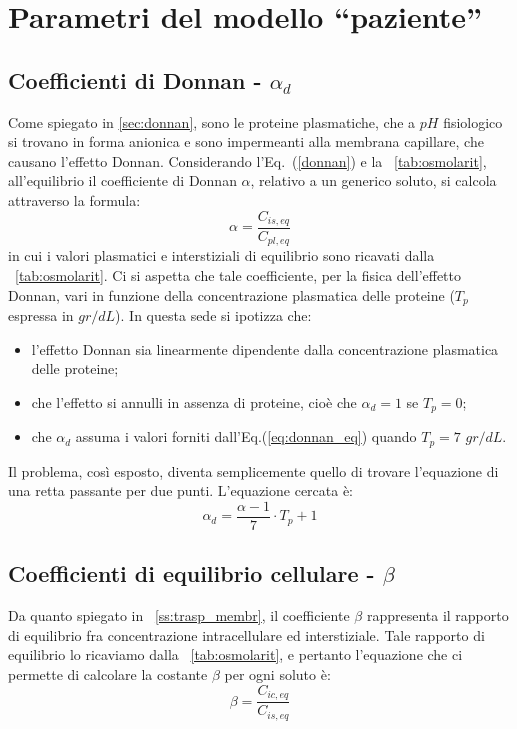 \chapter{Parametri del modello ``paziente''}\label{app:A}
\section{Coefficienti di Donnan - $\alpha_d$}
Come spiegato in \textsection\ref{sec:donnan}, sono le proteine plasmatiche, che a $pH$ fisiologico si trovano in forma anionica e sono impermeanti alla membrana capillare, che causano l'effetto Donnan. Considerando l'Eq.~(\ref{donnan}) e la \tablename~\ref{tab:osmolarit}, all'equilibrio il coefficiente di Donnan $\alpha$, relativo a un generico soluto, si calcola attraverso la formula:
\begin{equation}\label{eq:donnan_eq}
	\alpha = \frac{C_{is,eq}}{C_{pl,eq}}
\end{equation}
in cui i valori plasmatici e interstiziali di equilibrio sono ricavati dalla \tablename~\ref{tab:osmolarit}. Ci si aspetta che tale coefficiente, per la fisica dell'effetto Donnan, vari in funzione della concentrazione plasmatica delle proteine ($T_p$ espressa in $gr/dL$). In questa sede si ipotizza che:
\begin{itemize}
	\item l'effetto Donnan sia linearmente dipendente dalla concentrazione plasmatica delle proteine;
	\item che l'effetto si annulli in assenza di proteine, cioè che $\alpha_d = 1$ se $T_p=0$;
	\item che $\alpha_d$ assuma i valori forniti dall'Eq.(\ref{eq:donnan_eq}) quando $T_p=7$ $gr/dL$.
\end{itemize}
Il problema, così esposto, diventa semplicemente quello di trovare l'equazione di una retta passante per due punti. L'equazione cercata è:
\begin{equation}\label{eq:donnan}
	\alpha_d = \frac{\alpha-1}{7} \cdot T_p + 1
\end{equation}

\section{Coefficienti di equilibrio cellulare - $\beta$}\label{sec:beta}
Da quanto spiegato in \textsection~\ref{ss:trasp_membr}, il coefficiente $\beta$ rappresenta il rapporto di equilibrio fra concentrazione intracellulare ed interstiziale. Tale rapporto di equilibrio lo ricaviamo dalla \tablename~\ref{tab:osmolarit}, e pertanto l'equazione che ci permette di calcolare la costante $\beta$ per ogni soluto è:
\begin{equation}
	\beta = \frac{C_{ic,eq}}{C_{is,eq}}
\end{equation}


